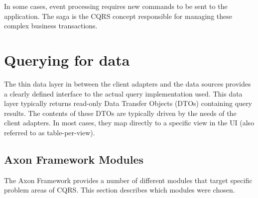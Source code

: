 In some cases, event processing requires new commands to be sent to the
application. The saga is the CQRS concept responsible for managing these
complex business transactions.

\section*{Querying for data}

The thin data layer in between the client adapters and the data sources
provides a clearly defined interface to the actual query implementation
used. This data layer typically returns read-only Data Transfer Objects (DTOs)
containing query results. The contents of these DTOs are typically driven by
the needs of the client adapters. In most cases, they map directly to a
specific view in the UI (also referred to as table-per-view).

\subsection{Axon Framework Modules}

The Axon Framework provides a number of different modules that target specific
problem areas of CQRS. This section describes which modules were chosen.

